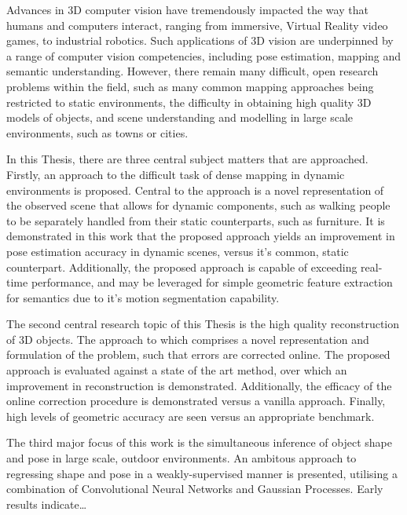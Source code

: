 Advances in 3D computer vision have tremendously impacted the way that humans and computers interact,
ranging from immersive, Virtual Reality video games, to industrial robotics. Such applications of 3D 
vision are underpinned by a range of computer vision competencies, including pose estimation, mapping 
and semantic understanding. However, there remain many difficult, open research problems within the field, 
such as many common mapping approaches being restricted to static environments, the difficulty in obtaining 
high quality 3D models of objects, and scene understanding and modelling in large scale environments, such as 
towns or cities.

In this Thesis, there are three central subject matters that are approached. Firstly, an approach to the 
difficult task of dense mapping in dynamic environments is proposed. Central to the approach is a novel 
representation of the observed scene that allows for dynamic components, such as walking people to be 
separately handled from their static counterparts, such as furniture. It is demonstrated in this work that 
the proposed approach yields an improvement in pose estimation accuracy in dynamic scenes, versus it's 
common, static counterpart. Additionally, the proposed approach is capable of exceeding real-time performance, 
and may be leveraged for simple geometric feature extraction for semantics due to it's motion segmentation
capability.

The second central research topic of this Thesis is the high quality reconstruction of 3D objects. 
The approach to which comprises a novel representation and formulation of the problem, such that errors are 
corrected online. The proposed approach is evaluated against a state of the art method, over which an 
improvement in reconstruction is demonstrated. Additionally, the efficacy of the online correction procedure 
is demonstrated versus a vanilla approach. Finally, high levels of geometric accuracy are seen versus an appropriate 
benchmark.

The third major focus of this work is the simultaneous inference of object shape and pose in large scale, outdoor environments. 
An ambitous approach to regressing shape and pose in a weakly-supervised manner is presented, utilising a combination 
of Convolutional Neural Networks and Gaussian Processes. Early results indicate\dots

